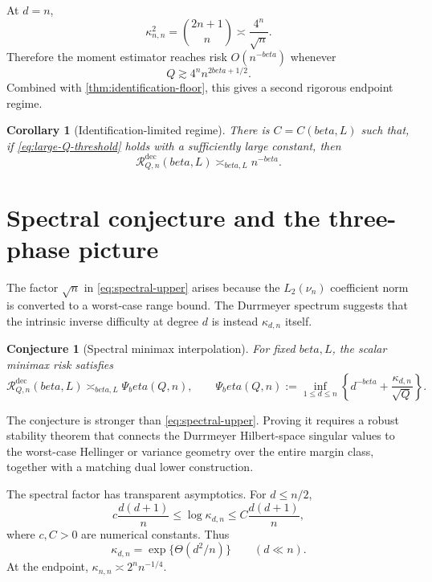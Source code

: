 \documentclass[11pt]{article}
\def\beta{beta}%
\newtheorem{corollary}[theorem]{Corollary}
\newtheorem{conjecture}[theorem]{Conjecture}
\newcommand{\calR}{\mathcal R}
\begin{document}
At $d=n$,
\[
\kappa_{n,n}^2
=
\binom{2n+1}{n}
\asymp
\frac{4^n}{\sqrt n}.
\]
Therefore the moment estimator reaches risk $O(n^{-\beta})$ whenever
\begin{equation}
\label{eq:large-Q-threshold}
Q
\gtrsim
4^n n^{2\beta+1/2}.
\end{equation}
Combined with \cref{thm:identification-floor}, this gives a second rigorous endpoint regime.

\begin{corollary}[Identification-limited regime]
\label{cor:identification-limited}
There is $C=C(\beta,L)$ such that, if \eqref{eq:large-Q-threshold} holds with a sufficiently large constant, then
\[
\calR^{\mathrm{dec}}_{Q,n}(\beta,L)
\asymp_{\beta,L}
n^{-\beta}.
\]
\end{corollary}

\section{Spectral conjecture and the three-phase picture}
\label{sec:spectral-conjecture}

The factor $\sqrt n$ in \eqref{eq:spectral-upper} arises because the $L_2(\nu_n)$ coefficient norm is converted to a worst-case range bound.  The Durrmeyer spectrum suggests that the intrinsic inverse difficulty at degree $d$ is instead $\kappa_{d,n}$ itself.

\begin{conjecture}[Spectral minimax interpolation]
\label{conj:Psi}
For fixed $\beta,L$, the scalar minimax risk satisfies
\begin{equation}
\label{eq:Psi}
\calR^{\mathrm{dec}}_{Q,n}(\beta,L)
\asymp_{\beta,L}
\Psi_\beta(Q,n),
\qquad
\Psi_\beta(Q,n)
:=
\inf_{1\le d\le n}
\left\{
 d^{-\beta}
+
\frac{\kappa_{d,n}}{\sqrt Q}
\right\}.
\end{equation}
\end{conjecture}

The conjecture is stronger than \eqref{eq:spectral-upper}.  Proving it requires a robust stability theorem that connects the Durrmeyer Hilbert-space singular values to the worst-case Hellinger or variance geometry over the entire margin class, together with a matching dual lower construction.

The spectral factor has transparent asymptotics.  For $d\le n/2$,
\begin{equation}
\label{eq:kappa-asymp}
 c\frac{d(d+1)}{n}
\le
\log\kappa_{d,n}
\le
C\frac{d(d+1)}{n},
\end{equation}
where $c,C>0$ are numerical constants.  Thus
\[
\kappa_{d,n}
=
\exp\{\Theta(d^2/n)\}
\qquad(d\ll n).
\]
At the endpoint, $\kappa_{n,n}\asymp2^nn^{-1/4}$.
\end{document}
